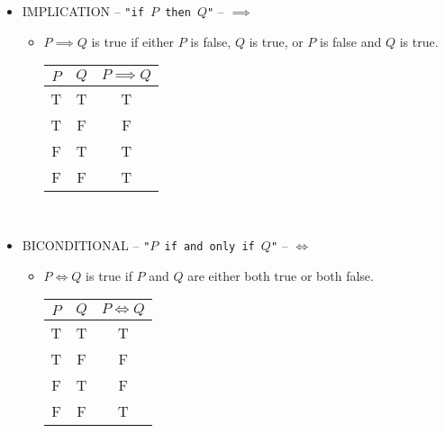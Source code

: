 \begin{itemize}
\begin{itemize}
                    \vphantom
                    \\
                \end{itemize}
            \item IMPLICATION -- \texttt{"if \(P\) then \(Q\)"} -- \(\implies\)
                \begin{itemize}
                    \item \(P\implies Q\) is true if either \(P\) is false, \(Q\) is true, or \(P\) is false and \(Q\) is true.
                    \\
                    \begin{center}
                    \begin{tabular}{c|c|c}
                        \hline
                        \(P\) & \(Q\) & \(P\implies Q\) \\
                        \hline
                        T & T & T \\
                        T & F & F \\
                        F & T & T \\
                        F & F & T \\
                        \hline
                    \end{tabular}
                    \end{center}
                    \vphantom
                    \\
                \end{itemize}
            \item BICONDITIONAL -- \texttt{"\(P\) if and only if \(Q\)"} -- \(\iff\)
                \begin{itemize}
                    \item \(P\iff Q\) is true if \(P\) and \(Q\) are either both true or both false.
                    \\
                    \begin{center}
                    \begin{tabular}{c|c|c}
                        \hline
                        \(P\) & \(Q\) & \(P\iff Q\) \\
                        \hline
                        T & T & T \\
                        T & F & F \\
                        F & T & F \\
                        F & F & T \\
                        \hline

\end{tabular}
\end{center}
\end{itemize}
\end{itemize}
